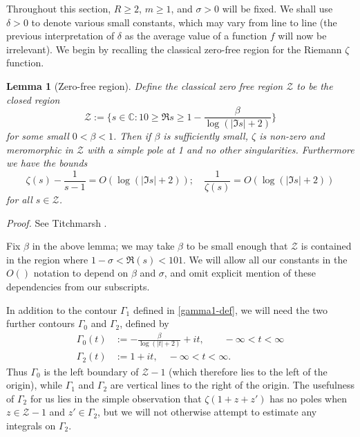 \documentclass[12pt,a4paper,reqno]{amsart}
\numberwithin{equation}{section}
\theoremstyle{plain}
\newtheorem{lemma}[subsection]{Lemma}
\theoremstyle{definition}
\renewcommand{\geq}{\geqslant}
\def\C{{\mathbb C}}
\def\vs{\vspace{11pt}}
\def\ni{\noindent}
\def\proof{\noindent\textit{Proof. }}
\def\endproof{\hfill{\usebox{\proofbox}}}
\def\emph#1{{\it #1}}
\begin{document}
\ni Throughout this section, $R \geq 2$, $m \geq 1$, and $\sigma > 0$ will be fixed.  We shall use $\delta > 0$
to denote various small constants, which may vary from line to line (the previous interpretation of $\delta$ as the average value of a function $f$ will
now be irrelevant). 
We begin by recalling the classical zero-free region for the Riemann $\zeta$ 
function.

\begin{lemma}[Zero-free region]\label{basic-zeta-facts} Define the \emph{classical zero free region} $\mathcal{Z}$ to be the closed region
\[ \mathcal{Z} := \{ s \in \C: 10 \geq \Re s \geq 1 - \frac{\beta}{\log(|\Im s| + 2)} \}\]
for some small $0 < \beta < 1$.  Then if $\beta$ is sufficiently small,
$\zeta$ is non-zero and meromorphic in $\mathcal{Z}$ with a simple pole at 1 and no other singularities.
Furthermore we have
the bounds
$$\zeta(s) - \frac{1}{s-1} = O(\log(|\Im s| + 2)); \quad \frac{1}{\zeta(s)} = O(\log(|\Im s| + 2))$$
for all $s \in \mathcal{Z}$.
\end{lemma}

\proof  
See Titchmarsh \cite[Chapter 3]{titchmarsh}.
\endproof\vspace{11pt}

\ni Fix $\beta$ in the above lemma; we may take $\beta$ to be small enough
that $\mathcal{Z}$ is contained in the region where $1-\sigma < \Re(s) < 101$.
We will allow all our constants in the $O()$ notation
to depend on $\beta$ and $\sigma$, and omit explicit mention of these dependencies from our subscripts.\vs

\ni In addition to the contour $\Gamma_1$ defined in \eqref{gamma1-def}, we will need the two further contours $\Gamma_0$
and $\Gamma_2$, defined by
\begin{equation}\label{gamma-1-param} 
\begin{split}
\Gamma_0(t) &:= - \frac{\beta}{\log(|t| + 2)} + it, \qquad -\infty < t < \infty\\
\Gamma_2(t) &:= 1 + it, \quad -\infty < t < \infty.
\end{split}
\end{equation}
Thus $\Gamma_0$ is the left boundary of $\mathcal{Z}-1$ (which therefore lies to the left of the origin), 
while $\Gamma_1$ and $\Gamma_2$ are vertical lines to the right of the origin.  The usefulness of $\Gamma_2$ for us
lies in the simple observation that $\zeta(1 + z + z')$ has no poles when $z \in \mathcal{Z}-1$ and 
$z' \in \Gamma_2$, but we will not otherwise attempt to estimate any integrals on $\Gamma_2$.\vs
\end{document}

